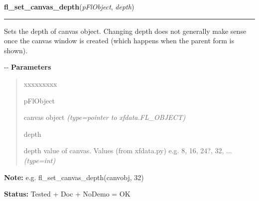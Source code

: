 \hspace{.8\funcindent}\begin{boxedminipage}{\funcwidth}

    \raggedright \textbf{fl\_set\_canvas\_depth}(\textit{pFlObject}, \textit{depth})

    \vspace{-1.5ex}

    \rule{\textwidth}{0.5\fboxrule}
\setlength{\parskip}{2ex}

Sets the depth of canvas object. Changing depth does not generally make
sense once the canvas window is created (which happens when the parent
form is shown).

-{}-
\setlength{\parskip}{1ex}
      \textbf{Parameters}
      \vspace{-1ex}

      \begin{quote}
        \begin{Ventry}{xxxxxxxxx}

          \item[pFlObject]


canvas object
            {\it (type=pointer to xfdata.FL\_OBJECT)}

          \item[depth]


depth value of canvas. Values (from xfdata.py) e.g. 8, 16, 24?, 32, ...
            {\it (type=int)}

        \end{Ventry}

      \end{quote}

\textbf{Note:} 
e.g. fl\_set\_canvas\_depth(canvobj, 32)


\textbf{Status:} 
Tested + Doc + NoDemo = OK


    \end{boxedminipage}

    \label{xformslib:flcanvas:fl_set_canvas_attributes}

    \vspace{0.5ex}

